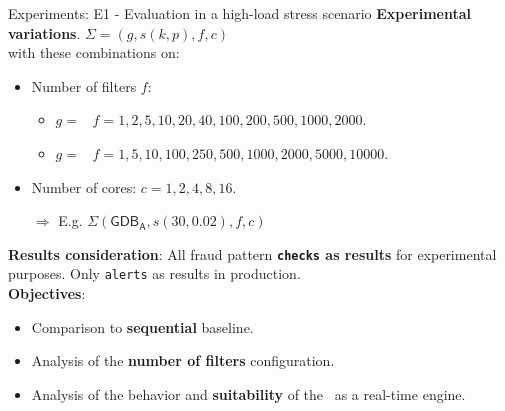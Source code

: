 \begin{frame}{Experiments: E1 - Evaluation in a high-load stress scenario}
\textbf{Experimental variations}. $\Sigma= (g, s(k, p), f, c)$\\
with these combinations on:
\vspace{0.3em}
\begin{itemize}
    \item Number of filters $f$:
    \begin{itemize}
        \item $g = $ \smallG\ $f=1,2,5,10,20,40,100,200,500,1000,2000$.
        \item $g = $ \mediumG\ $f=1,5,10,100,250,500,1000,2000,5000,10000$.
    \end{itemize} 
    \item Number of cores: $c = 1, 2, 4, 8, 16$.
    \item[$\Rightarrow$] {\small E.g. $\Sigma(\mathsf{GDB_A}, s(30, 0.02), f, c)$\\}
\end{itemize}
\vspace{0.5em}
\textbf{Results consideration}: All fraud pattern \textbf{\texttt{checks} as results} for experimental purposes. Only \texttt{alerts} as results in production.\\
\vspace{0.5em}
\textbf{Objectives}:
\begin{itemize}
    \item Comparison to \textbf{sequential} baseline.
    \item Analysis of the \textbf{number of filters} configuration.
    \item Analysis of the behavior and \textbf{suitability} of the \DPATM\ as a real-time engine.
\end{itemize}
\end{frame}


